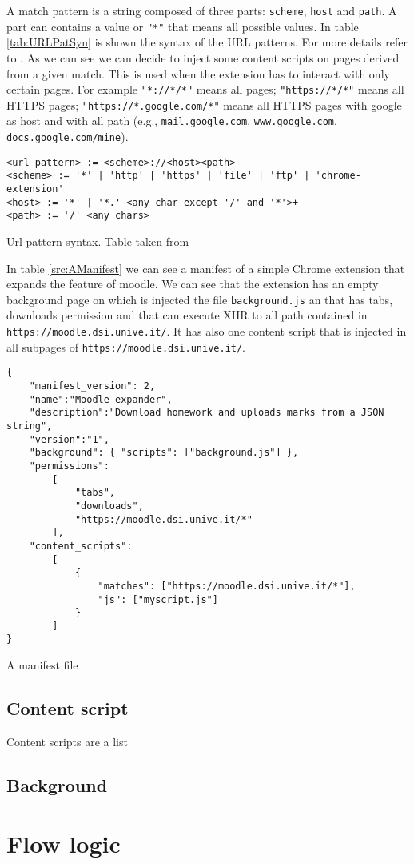 A match pattern is a string composed of three parts: \texttt{scheme}, \texttt{host} and \texttt{path}. A part can contains a value or \texttt{"*"} that means all possible values. In table \ref{tab:URLPatSyn} is shown the syntax of the URL patterns. For more details refer to \cite{ChromeExtensionMatch}. As we can see we can decide to inject some content scripts on pages derived from a given match. This is used when the extension has to interact with only certain pages. For example \texttt{"*://*/*"} means all pages; \texttt{"https://*/*"} means all HTTPS pages; \texttt{"https://*.google.com/*"} means all HTTPS pages with google as host and with all path (e.g., \texttt{mail.google.com}, \texttt{www.google.com}, \texttt{docs.google.com/mine}).

\begin{table}[tlb]
\begin{verbatim}
<url-pattern> := <scheme>://<host><path>
<scheme> := '*' | 'http' | 'https' | 'file' | 'ftp' | 'chrome-extension'
<host> := '*' | '*.' <any char except '/' and '*'>+
<path> := '/' <any chars>
\end{verbatim}
\caption{Url pattern syntax. Table taken from \cite{ChromeExtensionMatch}}
\label{tab:URLPatSyn}
\end{table}

In table \ref{src:AManifest} we can see a manifest of a simple Chrome extension that expands the feature of moodle. We can see that the extension has an empty background page on which is injected the file \texttt{background.js} an that has tabs, downloads permission and that can execute XHR to all path contained in \texttt{https://moodle.dsi.unive.it/}. It has also one content script that is injected in all subpages of \texttt{https://moodle.dsi.unive.it/}.
\begin{table}[tlb]
\lstset{language=java,showstringspaces=false}
\begin{small}
\begin{lstlisting}
{
	"manifest_version": 2,
	"name":"Moodle expander",
	"description":"Download homework and uploads marks from a JSON string",
	"version":"1",
	"background": { "scripts": ["background.js"] },
	"permissions":  
		[
			"tabs",
			"downloads",
			"https://moodle.dsi.unive.it/*"
		],
	"content_scripts": 
		[
			{
				"matches": ["https://moodle.dsi.unive.it/*"],
				"js": ["myscript.js"]
			}
		]
}
\end{lstlisting}
\end{small}
\caption{A manifest file}
\label{src:AManifest}
\end{table}

\subsection{Content script}
Content scripts are a list

\subsection{Background}

\section{Flow logic}
\label{sec:FlowLogic}
